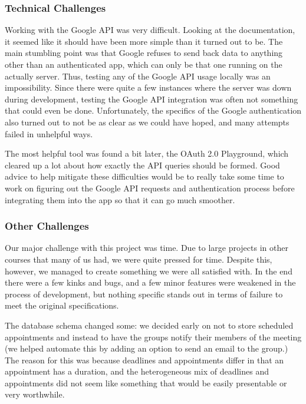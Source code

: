 \documentclass{article}
\begin{document}
			\subsubsection[Technical Challenges]{Technical Challenges}
			Working with the Google API was very difficult.
			Looking at the documentation, it seemed like it should have been more simple
			than it turned out to be. The main stumbling point was that Google refuses to
			send back data to anything other than an authenticated app, which can only be
			that one running on the actually server. Thus, testing any of the Google API
			usage locally was an impossibility. Since there were quite a few instances
			where the server was down during development, testing the Google API integration
			was often not something that could even be done. Unfortunately, the specifics
			of the Google authentication also turned out to not be as clear as we could
			have hoped, and many attempts failed in unhelpful ways.

			The most helpful tool
			was found a bit later, the OAuth 2.0 Playground, which cleared up a lot about
			how exactly the API queries should be formed. Good advice to help mitigate
			these difficulties would be to really take some time to work on figuring
			out the Google API requests and authentication process before integrating
			them into the app so that it can go much smoother.

			\subsubsection[Other Challenges]{Other Challenges}
			Our major challenge with this project was time. Due to large projects in
			other courses that many of us had, we were quite pressed for time. Despite
			this, however, we managed to create something we were all satisfied with.
			In the end there were a few kinks and bugs, and a few minor features were
			weakened in the process of development, but nothing specific stands out
			in terms of failure to meet the original specifications.

			The database
			schema changed some: we decided early on not to store scheduled appointments
			and instead to have the groups notify their members of the meeting (we helped
			automate this by adding an option to send an email to the group.) The reason
			for this was because deadlines and appointments differ in that an appointment
			has a duration, and the heterogeneous mix of deadlines and appointments
			did not seem like something that would be easily presentable or very worthwhile.
\end{document}
